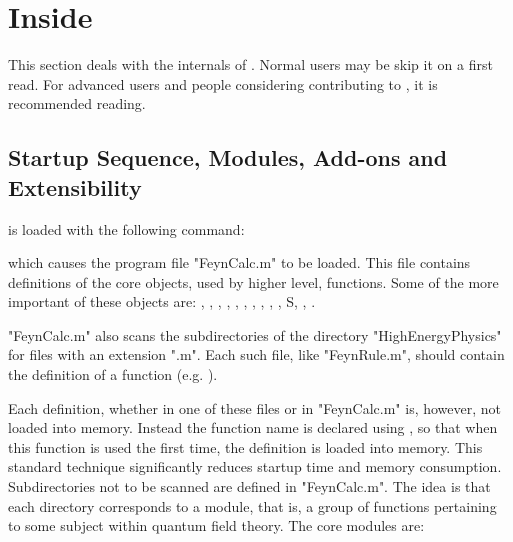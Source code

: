 \section{Inside \fc}
\label{inside}

This section deals with the internals of \fc. Normal users may be skip it on a first read. For advanced users and people considering contributing to \fc, it is recommended reading.

\subsection{Startup Sequence, Modules, Add-ons and Extensibility}
\label{modules}

\fc is loaded with the following command:


which causes the program file "FeynCalc.m" to be loaded. This file contains definitions of the core objects, used by higher level, functions. Some of the more important of these objects are: , , , , , , , , , , S, , .

"FeynCalc.m" also scans the subdirectories of the directory "HighEnergyPhysics" for files with an extension ".m". Each such file, like "FeynRule.m", should contain the definition of a function (e.g. ). 

Each definition, whether in one of these files or in "FeynCalc.m" is, however, not loaded into memory. Instead the function name is declared using , so that when this function is used the first time, the definition is loaded into memory. This standard technique significantly reduces startup time and memory consumption. Subdirectories not to be scanned are defined in "FeynCalc.m". The idea is that each directory corresponds to a module, that is, a group of functions pertaining to some subject within quantum field theory. The core modules are:

